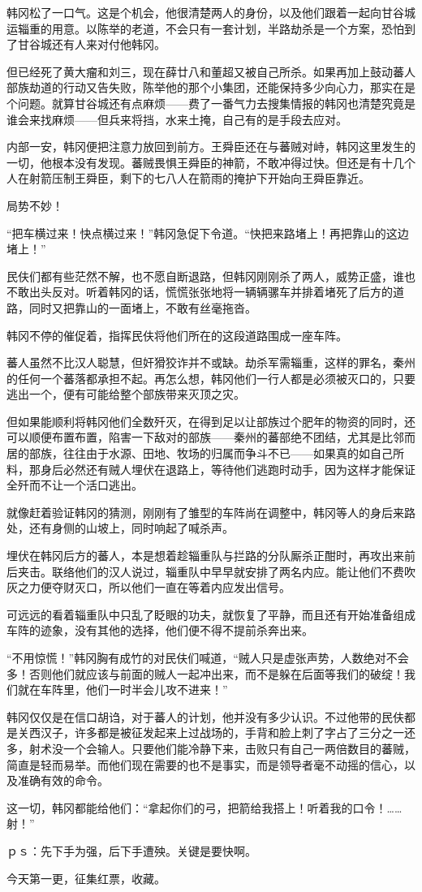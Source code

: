 韩冈松了一口气。这是个机会，他很清楚两人的身份，以及他们跟着一起向甘谷城运辎重的用意。以陈举的老道，不会只有一套计划，半路劫杀是一个方案，恐怕到了甘谷城还有人来对付他韩冈。

但已经死了黄大瘤和刘三，现在薛廿八和董超又被自己所杀。如果再加上鼓动蕃人部族劫道的行动又告失败，陈举他的那个小集团，还能保持多少向心力，那实在是个问题。就算甘谷城还有点麻烦——费了一番气力去搜集情报的韩冈也清楚究竟是谁会来找麻烦——但兵来将挡，水来土掩，自己有的是手段去应对。

内部一安，韩冈便把注意力放回到前方。王舜臣还在与蕃贼对峙，韩冈这里发生的一切，他根本没有发现。蕃贼畏惧王舜臣的神箭，不敢冲得过快。但还是有十几个人在射箭压制王舜臣，剩下的七八人在箭雨的掩护下开始向王舜臣靠近。

局势不妙！

“把车横过来！快点横过来！”韩冈急促下令道。“快把来路堵上！再把靠山的这边堵上！”

民伕们都有些茫然不解，也不愿自断退路，但韩冈刚刚杀了两人，威势正盛，谁也不敢出头反对。听着韩冈的话，慌慌张张地将一辆辆骡车并排着堵死了后方的道路，同时又把靠山的一面堵上，不敢有丝毫拖沓。

韩冈不停的催促着，指挥民伕将他们所在的这段道路围成一座车阵。

蕃人虽然不比汉人聪慧，但奸猾狡诈并不或缺。劫杀军需辎重，这样的罪名，秦州的任何一个蕃落都承担不起。再怎么想，韩冈他们一行人都是必须被灭口的，只要逃出一个，便有可能给整个部族带来灭顶之灾。

但如果能顺利将韩冈他们全数歼灭，在得到足以让部族过个肥年的物资的同时，还可以顺便布置布置，陷害一下敌对的部族——秦州的蕃部绝不团结，尤其是比邻而居的部族，往往由于水源、田地、牧场的归属而争斗不已——如果真的如自己所料，那身后必然还有贼人埋伏在退路上，等待他们逃跑时动手，因为这样才能保证全歼而不让一个活口逃出。

就像赶着验证韩冈的猜测，刚刚有了雏型的车阵尚在调整中，韩冈等人的身后来路处，还有身侧的山坡上，同时响起了喊杀声。

埋伏在韩冈后方的蕃人，本是想着趁辎重队与拦路的分队厮杀正酣时，再攻出来前后夹击。联络他们的汉人说过，辎重队中早早就安排了两名内应。能让他们不费吹灰之力便夺财灭口，所以他们一直在等着内应发出信号。

可远远的看着辎重队中只乱了眨眼的功夫，就恢复了平静，而且还有开始准备组成车阵的迹象，没有其他的选择，他们便不得不提前杀奔出来。

“不用惊慌！”韩冈胸有成竹的对民伕们喊道，“贼人只是虚张声势，人数绝对不会多！否则他们就应该与前面的贼人一起冲出来，而不是躲在后面等我们的破绽！我们就在车阵里，他们一时半会儿攻不进来！”

韩冈仅仅是在信口胡诌，对于蕃人的计划，他并没有多少认识。不过他带的民伕都是关西汉子，许多都是被征发起来上过战场的，手背和脸上刺了字占了三分之一还多，射术没一个会输人。只要他们能冷静下来，击败只有自己一两倍数目的蕃贼，简直是轻而易举。而他们现在需要的也不是事实，而是领导者毫不动摇的信心，以及准确有效的命令。

这一切，韩冈都能给他们：“拿起你们的弓，把箭给我搭上！听着我的口令！……射！”

ｐｓ：先下手为强，后下手遭殃。关键是要快啊。

今天第一更，征集红票，收藏。

